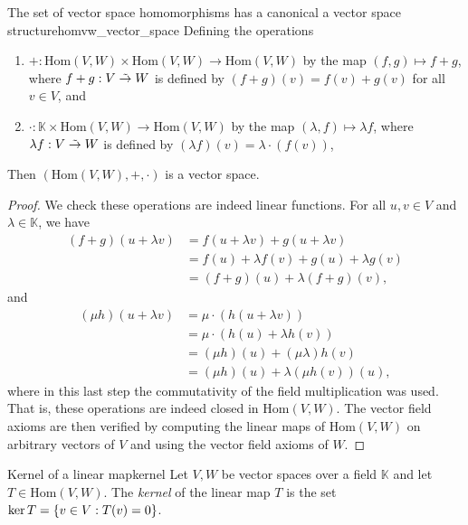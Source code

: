 \begin{proposition}{The set of vector space homomorphisms has a canonical a vector space structure}{homvw_vector_space}
    Defining the operations
    \begin{enumerate}[label=(\alph*)]
        \item \(+: \mathrm{Hom}(V,W) \times \mathrm{Hom}(V,W) \to \mathrm{Hom}(V,W)\) by the map \((f,g) \mapsto f + g\), where \(f+g : V \mathrel{\tilde{\to}} W\) is defined by \((f+g)(v) = f(v) + g(v)\) for all \(v \in V\), and
        \item \(\cdot : \mathbb{K} \times \mathrm{Hom}(V, W) \to \mathrm{Hom}(V, W)\) by the map \((\lambda, f) \mapsto \lambda f\), where \(\lambda f : V \mathrel{\tilde{\to}} W\) is defined by \((\lambda f)(v) =\lambda\cdot (f(v)) \),
    \end{enumerate}
    Then \((\mathrm{Hom}(V,W), +, \cdot)\) is a vector space.
\end{proposition}
\begin{proof}
    We check these operations are indeed linear functions. For all \(u, v \in V\) and \(\lambda \in \mathbb{K}\), we have
    \begin{align*}
        (f+g)(u + \lambda v) &= f(u + \lambda v) + g(u + \lambda v)\\
                             &= f(u) + \lambda f(v) + g(u) + \lambda g(v)\\
                             &= (f+g)(u) + \lambda (f+g)(v),
    \end{align*}
    and
    \begin{align*}
        (\mu h)(u + \lambda v) &= \mu \cdot ( h(u + \lambda v))\\
                               &= \mu \cdot ( h(u) + \lambda h(v))\\
                               &= (\mu h)(u) + (\mu \lambda) h(v)\\
                               &= (\mu h)(u) + \lambda (\mu h(v))(u),
    \end{align*}
    where in this last step the commutativity of the field multiplication was used. That is, these operations are indeed closed in \(\mathrm{Hom}(V, W)\). The vector field axioms are then verified by computing the linear maps of \(\mathrm{Hom}(V,W)\) on arbitrary vectors of \(V\) and using the vector field axioms of \(W\).
\end{proof}

\begin{definition}{Kernel of a linear map}{kernel}
    Let \(V, W\) be vector spaces over a field \(\mathbb{K}\) and let \(T \in \mathrm{Hom}(V,W)\). The \emph{kernel} of the linear map \(T\) is the set \(\ker T = \{v \in V : T(v) = 0\}\).
\end{definition}

